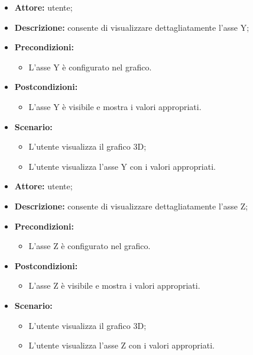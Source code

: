\begin{itemize}
    \item \textbf{Attore:} utente;
    \item \textbf{Descrizione:} consente di visualizzare dettagliatamente l'asse Y;
    \item \textbf{Precondizioni:} 
    \begin{itemize}
        \item L'asse Y è configurato nel grafico.
    \end{itemize}
    \item \textbf{Postcondizioni:} 
    \begin{itemize}
        \item L'asse Y è visibile e mostra i valori appropriati.
    \end{itemize}
    \item \textbf{Scenario:} 
    \begin{itemize}
        \item L'utente visualizza il grafico 3D;
        \item L'utente visualizza l'asse Y con i valori appropriati.
    \end{itemize}
\end{itemize}
\begin{itemize}
    \item \textbf{Attore:} utente;
    \item \textbf{Descrizione:} consente di visualizzare dettagliatamente l'asse Z;
    \item \textbf{Precondizioni:} 
    \begin{itemize}
        \item L'asse Z è configurato nel grafico.
    \end{itemize}
    \item \textbf{Postcondizioni:} 
    \begin{itemize}
        \item L'asse Z è visibile e mostra i valori appropriati.
    \end{itemize}
    \item \textbf{Scenario:} 
    \begin{itemize}
        \item L'utente visualizza il grafico 3D;
        \item L'utente visualizza l'asse Z con i valori appropriati.
    \end{itemize}
\end{itemize}



